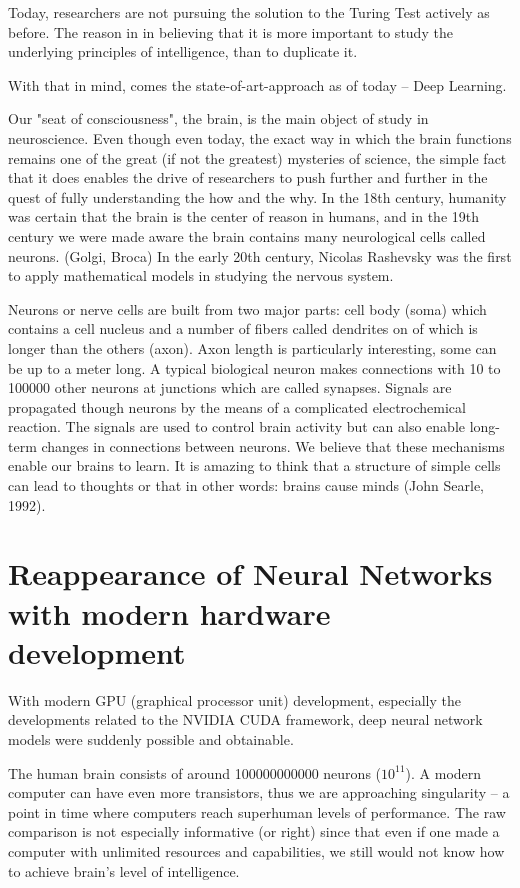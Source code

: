 \documentclass[b5paper]{book}
\begin{document}
Today, researchers are not pursuing the solution to the Turing Test actively as before. The reason in in believing that it is more important to study the underlying principles of intelligence, than to duplicate it. 

With that in mind, comes the state-of-art-approach as of today -- Deep Learning.

Our "seat of consciousness", the brain, is the main object of study in neuroscience. Even though even today, the exact way in which the brain functions remains one of the great (if not the greatest) mysteries of science, the simple fact that it does enables the drive of researchers to push further and further in the quest of fully understanding the how and the why. In the 18th century, humanity was certain that the brain is the center of reason in humans, and in the 19th century we were made aware the brain contains many neurological cells called neurons. (Golgi, Broca) In the early 20th century, Nicolas Rashevsky was the first to apply mathematical models in studying the nervous system. 

Neurons or nerve cells are built from two major parts: cell body (soma) which contains a cell nucleus and a number of fibers called dendrites on of which is longer than the others (axon). Axon length is particularly interesting, some can be up to a meter long. A typical biological neuron makes connections with 10 to 100000 other neurons at junctions which are called synapses. Signals are propagated though neurons by the means of a complicated electrochemical reaction. The signals are used to control brain activity but can also enable long-term changes in connections between neurons. We believe that these mechanisms enable our brains to learn. It is amazing to think that a structure of simple cells can lead to thoughts or that in other words: brains cause minds (John Searle, 1992).

\section{Reappearance of Neural Networks with modern hardware development}

With modern GPU (graphical processor unit) development, especially the developments related to the NVIDIA CUDA framework, deep neural network models were suddenly possible and obtainable.

The human brain consists of around 100000000000 neurons (\(10^11 \)). A modern computer can have even more transistors, thus we are approaching singularity -- a point in time where computers reach superhuman levels of performance. The raw comparison is not especially informative (or right) since that even if one made a computer with unlimited resources and capabilities, we still would not know how to achieve brain's level of intelligence.
\end{document}
